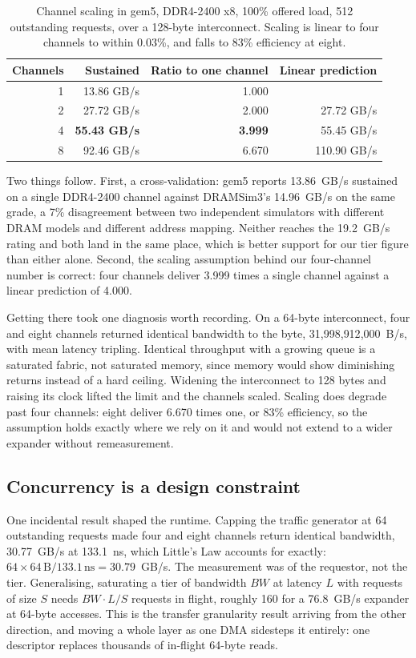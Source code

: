 \documentclass[10pt,a4paper]{article}
\begin{document}
\begin{table}[htbp]
\centering\small
\caption{Channel scaling in gem5, DDR4-2400 x8, 100\% offered load, 512
outstanding requests, over a 128-byte interconnect. Scaling is linear to four
channels to within 0.03\%, and falls to 83\% efficiency at eight.}
\label{tab:channels}
\begin{tabular}{rrrr}
\toprule
Channels & Sustained & Ratio to one channel & Linear prediction \\
\midrule
1 & 13.86 GB/s & 1.000 & \\
2 & 27.72 GB/s & 2.000 & 27.72 GB/s \\
4 & \textbf{55.43 GB/s} & \textbf{3.999} & 55.45 GB/s \\
8 & 92.46 GB/s & 6.670 & 110.90 GB/s \\
\bottomrule
\end{tabular}
\end{table}

Two things follow. First, a cross-validation: gem5 reports 13.86~GB/s sustained
on a single DDR4-2400 channel against DRAMSim3's 14.96~GB/s on the same grade, a
7\% disagreement between two independent simulators with different DRAM models
and different address mapping. Neither reaches the 19.2~GB/s rating and both land
in the same place, which is better support for our tier figure than either alone.
Second, the scaling assumption behind our four-channel number is correct: four
channels deliver 3.999 times a single channel against a linear prediction of
4.000.

Getting there took one diagnosis worth recording. On a 64-byte interconnect, four
and eight channels returned identical bandwidth to the byte,
31{,}998{,}912{,}000~B/s, with mean latency tripling. Identical throughput with a
growing queue is a saturated fabric, not saturated memory, since memory would show
diminishing returns instead of a hard ceiling. Widening the interconnect to 128
bytes and raising its clock lifted the limit and the channels scaled. Scaling does
degrade past four channels: eight deliver 6.670 times one, or 83\% efficiency, so
the assumption holds exactly where we rely on it and would not extend to a wider
expander without remeasurement.

\subsection{Concurrency is a design constraint}
\label{sec:concurrency}

One incidental result shaped the runtime. Capping the traffic generator at 64
outstanding requests made four and eight channels return identical bandwidth,
30.77~GB/s at 133.1~ns, which Little's Law accounts for exactly:
$64 \times 64\,\text{B} / 133.1\,\text{ns} = 30.79$~GB/s. The measurement was of
the requestor, not the tier. Generalising, saturating a tier of bandwidth $BW$ at
latency $L$ with requests of size $S$ needs $BW \cdot L / S$ requests in flight,
roughly 160 for a 76.8~GB/s expander at 64-byte accesses. This is the transfer
granularity result arriving from the other direction, and moving a whole layer as
one DMA sidesteps it entirely: one descriptor replaces thousands of in-flight
64-byte reads.
\end{document}
